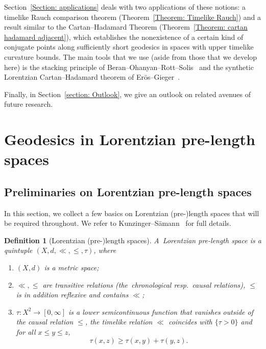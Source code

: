 \documentclass[a4paper,11pt]{article}
\numberwithin{equation}{section}
\theoremstyle{plain}
\newtheorem{Definition}{Definition}[section]
\theoremstyle{definition}
\begin{document}
Section~\ref{Section: applications} deals with two applications of these notions: a timelike Rauch comparison theorem (Theorem~\ref{Theorem: Timelike Rauch}) and a result similar to the Cartan--Hadamard Theorem (Theorem~\ref{Theorem: cartan hadamard adjacent}), which establishes the nonexistence of a certain kind of conjugate points along sufficiently short geodesics in spaces with upper timelike curvature bounds. The main tools that we use (aside from those that we develop here) is the stacking principle of Beran--Ohanyan--Rott--Solis~\cite{beran2023splitting} and the synthetic Lorentzian Cartan--Hadamard theorem of Er\"{o}s--Gieger~\cite{Eroes-Gieger25}.

Finally, in Section~\ref{section: Outlook}, we give an outlook on related avenues of future research.

\section{Geodesics in Lorentzian pre-length spaces}
\label{Section: Geodesics}

\subsection{Preliminaries on Lorentzian pre-length spaces}
\label{Subsection: preliminaries on LpLS}

In this section, we collect a few basics on Lorentzian (pre-)length spaces that will be required throughout. We refer to Kunzinger--S\"{a}mann~\cite{kunzinger2018lorentzian} for full details.

\begin{Definition}[Lorentzian (pre-)length spaces]
A~\emph{Lorentzian pre-length space} is a quintuple $(X,d,\ll,\leq,\tau)$, where
\begin{enumerate}
    \item $(X,d)$ is a metric space; 
    \item $\ll, \leq$ are transitive relations (the~\emph{chronological\/} resp.\ \emph{causal relations}), $\leq$ is in addition reflexive and contains $\ll$; 
    \item $\tau \colon X^2 \to [0,\infty]$ is a lower semicontinuous function that vanishes outside of the causal relation $\leq$, the timelike relation $\ll$ coincides with $\{\tau > 0\}$ and for all $x \leq y \leq z$,
    \begin{equation}
        \tau(x,z) \geq \tau(x,y) + \tau(y,z).
    \end{equation}
\end{enumerate}
\end{Definition}
\end{document}
